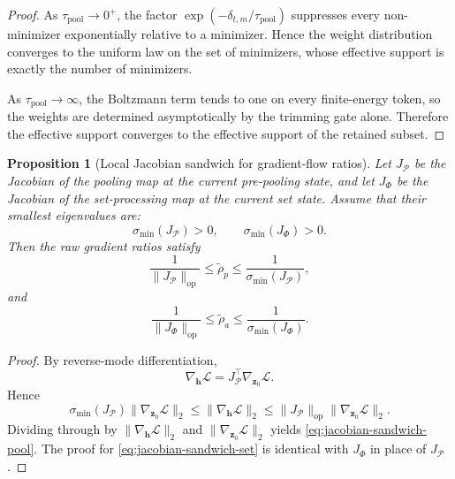 \documentclass{article}
\theoremstyle{plain}
\newtheorem{proposition}[theorem]{Proposition}
\theoremstyle{definition}
\theoremstyle{remark}
\begin{document}
\begin{proof}
As $\tau_{\mathrm{pool}}\to 0^+$, the factor $\exp(-\delta_{t,m}/\tau_{\mathrm{pool}})$ suppresses every non-minimizer exponentially relative to a minimizer. Hence the weight distribution converges to the uniform law on the set of minimizers, whose effective support is exactly the number of minimizers.

As $\tau_{\mathrm{pool}}\to \infty$, the Boltzmann term tends to one on every finite-energy token, so the weights are determined asymptotically by the trimming gate alone. Therefore the effective support converges to the effective support of the retained subset.
\end{proof}

\begin{proposition}[Local Jacobian sandwich for gradient-flow ratios]
\label{prop:jacobian-sandwich}
Let $J_{\mathcal{P}}$ be the Jacobian of the pooling map at the current pre-pooling state, and let $J_{\Phi}$ be the Jacobian of the set-processing map at the current set state. Assume that their smallest eigenvalues are:
\[
\sigma_{\min}(J_{\mathcal{P}})>0,
\qquad
\sigma_{\min}(J_{\Phi})>0.
\]
Then the raw gradient ratios satisfy
\begin{equation}
\label{eq:jacobian-sandwich-pool}
\frac{1}{\|J_{\mathcal{P}}\|_{\mathrm{op}}}
\le
\tilde\rho_p
\le
\frac{1}{\sigma_{\min}(J_{\mathcal{P}})},
\end{equation}
and
\begin{equation}
\label{eq:jacobian-sandwich-set}
\frac{1}{\|J_{\Phi}\|_{\mathrm{op}}}
\le
\tilde\rho_a
\le
\frac{1}{\sigma_{\min}(J_{\Phi})}.
\end{equation}
\end{proposition}

\begin{proof}
By reverse-mode differentiation,
\[
\nabla_{\mathbf{h}}\mathcal{L}
=
J_{\mathcal{P}}^{\top}\nabla_{\mathbf{z}_0}\mathcal{L}.
\]
Hence
\[
\sigma_{\min}(J_{\mathcal{P}})\|\nabla_{\mathbf{z}_0}\mathcal{L}\|_2
\le
\|\nabla_{\mathbf{h}}\mathcal{L}\|_2
\le
\|J_{\mathcal{P}}\|_{\mathrm{op}}
\|\nabla_{\mathbf{z}_0}\mathcal{L}\|_2.
\]
Dividing through by $\|\nabla_{\mathbf{h}}\mathcal{L}\|_2$ and $\|\nabla_{\mathbf{z}_0}\mathcal{L}\|_2$ yields \eqref{eq:jacobian-sandwich-pool}. The proof for \eqref{eq:jacobian-sandwich-set} is identical with $J_{\Phi}$ in place of $J_{\mathcal{P}}$.
\end{proof}

\end{document}
